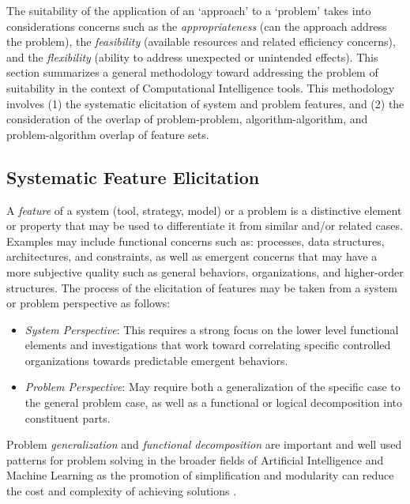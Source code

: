\documentclass[a4paper, 11pt]{article}
\begin{document}
The suitability of the application of an `approach' to a `problem' takes into considerations concerns such as the \emph{appropriateness} (can the approach address the problem), the \emph{feasibility} (available resources and related efficiency concerns), and the \emph{flexibility} (ability to address unexpected or unintended effects).
This section summarizes a general methodology toward addressing the problem of suitability in the context of Computational Intelligence tools. This methodology involves (1) the systematic elicitation of system and problem features, and (2) the consideration of the overlap of problem-problem, algorithm-algorithm, and problem-algorithm overlap of feature sets. 

\subsection{Systematic Feature Elicitation}
A \emph{feature} of a system (tool, strategy, model) or a problem is a distinctive element or property that may be used to differentiate it from similar and/or related cases. Examples may include functional concerns such as: processes, data structures, architectures, and constraints, as well as emergent concerns that may have a more subjective quality such as general behaviors, organizations, and higher-order structures. The process of the elicitation of features may be taken from a system or problem perspective as follows:

\begin{itemize}
	\item \emph{System Perspective}: This requires a strong focus on the lower level functional elements and investigations that work toward correlating specific controlled organizations towards predictable emergent behaviors. 
	\item \emph{Problem Perspective}: May require both a generalization of the specific case to the general problem case, as well as a functional or logical decomposition into constituent parts.
\end{itemize}

Problem \emph{generalization} and \emph{functional decomposition} are important and well used patterns for problem solving in the broader fields of Artificial Intelligence and Machine Learning as the promotion of simplification and modularity can reduce the cost and complexity of achieving solutions \cite{Russell2009, Brooks1986}.

%
%
\end{document}
